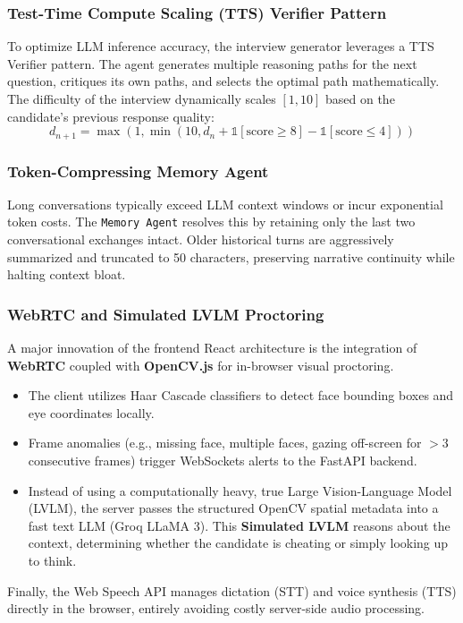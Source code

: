 \documentclass[10pt,journal,compsoc]{IEEEtran}
\begin{document}
\subsubsection{Test-Time Compute Scaling (TTS) Verifier Pattern}
To optimize LLM inference accuracy, the interview generator leverages a TTS Verifier pattern. The agent generates multiple reasoning paths for the next question, critiques its own paths, and selects the optimal path mathematically. 
The difficulty of the interview dynamically scales $[1, 10]$ based on the candidate's previous response quality:
\begin{equation}
    d_{n+1} = \max\left(1, \min\left(10, d_n + \mathbb{1}[\text{score} \geq 8] - \mathbb{1}[\text{score} \leq 4]\right)\right)
\end{equation}

\subsubsection{Token-Compressing Memory Agent}
Long conversations typically exceed LLM context windows or incur exponential token costs. The \texttt{Memory Agent} resolves this by retaining only the last two conversational exchanges intact. Older historical turns are aggressively summarized and truncated to 50 characters, preserving narrative continuity while halting context bloat.

\subsubsection{WebRTC and Simulated LVLM Proctoring}
A major innovation of the frontend React architecture is the integration of \textbf{WebRTC} coupled with \textbf{OpenCV.js} for in-browser visual proctoring.
\begin{itemize}
    \item The client utilizes Haar Cascade classifiers to detect face bounding boxes and eye coordinates locally.
    \item Frame anomalies (e.g., missing face, multiple faces, gazing off-screen for $>3$ consecutive frames) trigger WebSockets alerts to the FastAPI backend.
    \item Instead of using a computationally heavy, true Large Vision-Language Model (LVLM), the server passes the structured OpenCV spatial metadata into a fast text LLM (Groq LLaMA 3). This \textbf{Simulated LVLM} reasons about the context, determining whether the candidate is cheating or simply looking up to think.
\end{itemize}
Finally, the Web Speech API manages dictation (STT) and voice synthesis (TTS) directly in the browser, entirely avoiding costly server-side audio processing.
\end{document}
